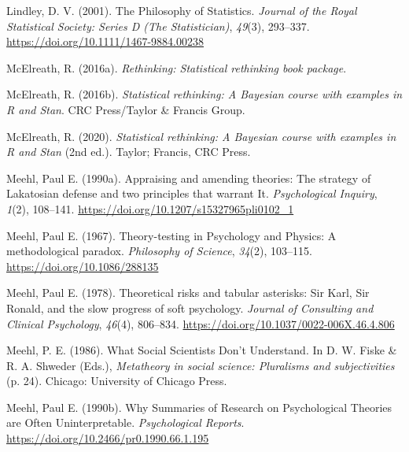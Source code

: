 \documentclass[
  a4paper,11pt,twoside,onecolumn,openright,final,oldfontcommands]{memoir}
\newlength{\cslhangindent}
\newlength{\cslentryspacingunit} %
\newenvironment{CSLReferences}[2] %
 {%
  \setlength{\parindent}{0pt}
  \ifodd #1
  \let\oldpar\par
  \def\par{\hangindent=\cslhangindent\oldpar}
  \fi
  \setlength{\parskip}{#2\cslentryspacingunit}
 }%
 {}
\theoremstyle{definition}
\theoremstyle{definition}
\theoremstyle{definition}
\theoremstyle{definition}
\theoremstyle{remark}
\begin{document}
\begin{CSLReferences}{1}{0}
\leavevmode{}%
Lindley, D. V. (2001). The {Philosophy} of {Statistics}. \emph{Journal of the Royal Statistical Society: Series D (The Statistician)}, \emph{49}(3), 293--337. \url{https://doi.org/10.1111/1467-9884.00238}

\leavevmode{}%
McElreath, R. (2016a). \emph{Rethinking: Statistical rethinking book package}.

\leavevmode{}%
McElreath, R. (2016b). \emph{Statistical rethinking: A {Bayesian} course with examples in {R} and {Stan}}. CRC Press/Taylor \& Francis Group.

\leavevmode{}%
McElreath, R. (2020). \emph{Statistical rethinking: A {Bayesian} course with examples in {R} and {Stan}} (2nd ed.). Taylor; Francis, CRC Press.

\leavevmode{}%
Meehl, Paul E. (1990a). Appraising and amending theories: {The} strategy of {Lakatosian} defense and two principles that warrant {It}. \emph{Psychological Inquiry}, \emph{1}(2), 108--141. \url{https://doi.org/10.1207/s15327965pli0102_1}

\leavevmode{}%
Meehl, Paul E. (1967). Theory-testing in {Psychology} and {Physics}: {A} methodological paradox. \emph{Philosophy of Science}, \emph{34}(2), 103--115. \url{https://doi.org/10.1086/288135}

\leavevmode{}%
Meehl, Paul E. (1978). Theoretical risks and tabular asterisks: {Sir} {Karl}, {Sir} {Ronald}, and the slow progress of soft psychology. \emph{Journal of Consulting and Clinical Psychology}, \emph{46}(4), 806--834. \url{https://doi.org/10.1037/0022-006X.46.4.806}

\leavevmode{}%
Meehl, P. E. (1986). What {Social} {Scientists} {Don}'t {Understand}. In D. W. Fiske \& R. A. Shweder (Eds.), \emph{Metatheory in social science: {Pluralisms} and subjectivities} (p. 24). Chicago: University of Chicago Press.

\leavevmode{}%
Meehl, Paul E. (1990b). Why {Summaries} of {Research} on {Psychological} {Theories} are {Often} {Uninterpretable}. \emph{Psychological Reports}. \url{https://doi.org/10.2466/pr0.1990.66.1.195}


\end{CSLReferences}
\end{document}
